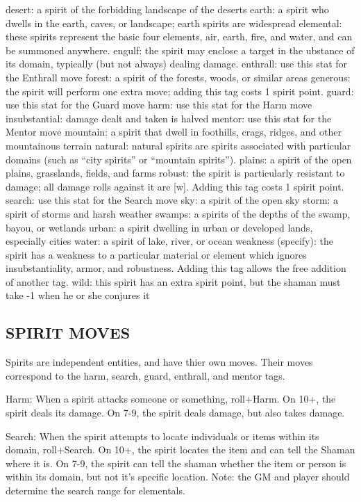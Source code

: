 desert: a spirit of the forbidding landscape of the deserts
earth: a spirit who dwells in the earth, caves, or landscape; earth spirits are widespread
elemental: these spirits represent the basic four elements, air, earth, fire, and water, and can be summoned anywhere.
engulf: the spirit may enclose a target in the ubstance of its domain, typically (but not always) dealing damage.
enthrall: use this stat for the Enthrall move
forest: a spirit of the forests, woods, or similar areas
generous: the spirit will perform one extra move; adding this tag costs 1 spirit point.
guard: use this stat for the Guard move
harm: use this stat for the Harm move
insubstantial: damage dealt and taken is halved
mentor: use this stat for the Mentor move
mountain: a spirit that dwell in foothills, crags, ridges, and other mountainous terrain
natural: natural spirits are spirits associated with particular domains (such as “city spirits” or “mountain spirits”).
plains: a spirit of the open plains, grasslands, fields, and farms
robust: the spirit is particularly resistant to damage; all damage rolls against it are [w]. Adding this tag costs 1 spirit point.
search: use this stat for the Search move
sky: a spirit of the open sky
storm: a spirit of storms and harsh weather
swamps: a spirits of the depths of the swamp, bayou, or wetlands
urban: a spirit dwelling in urban or developed lands, especially cities
water: a spirit of lake, river, or ocean
weakness (specify): the spirit has a weakness to a particular material or element which ignores insubstantiality, armor, and robustness. Adding this tag allows the free addition of another tag.
wild: this spirit has an extra spirit point, but the shaman must take -1 when he or she conjures it


\subsection{SPIRIT MOVES}

Spirits are independent entities, and have thier own moves. Their moves correspond to the harm, search, guard, enthrall, and mentor tags.

Harm: When a spirit attacks someone or something, roll+Harm. On 10+, the spirit deals its damage. On 7-9, the spirit deals damage, but also takes damage.

Search: When the spirit attempts to locate individuals or items within its domain, roll+Search. On 10+, the spirit locates the item and can tell the Shaman where it is. On 7-9, the spirit can tell the shaman whether the item or person is within its domain, but not it’s specific location. Note: the GM and player should determine the search range for elementals.

